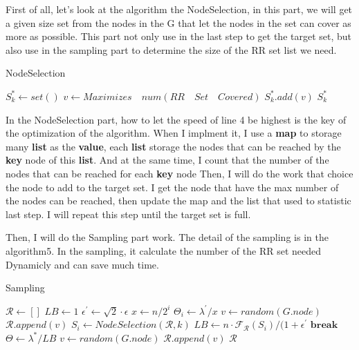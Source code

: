 \documentclass[conference,compsoc]{IEEEtran}
\begin{document}
      First of all, let's look at the algorithm the NodeSelection, in this part, we will get a given size set from the nodes in the G that let the nodes in the set can cover as more as possible.
      This part not only use in the last step to get the target set, but also use in the sampling part to determine the size of the RR set list we need.
      \begin{algorithm}
        \caption{NodeSelection}
        \begin{algorithmic}[1]
            \State $S_{k}^{*}\gets set()$
              \State $v\gets Maximizes\quad num(RR\quad Set\quad Covered)$
              \State $S_{k}^{*}.add(v)$
            \EndFor
          \EndFunction
          \State \Return $S_{k}^{*}$
        \end{algorithmic}
      \end{algorithm}
      In the NodeSelection part, how to let the speed of line 4 be highest is the key of the optimization of the algorithm.
      When I implment it, I use a \textbf{map} to storage many \textbf{list} as the \textbf{{value}}, each \textbf{list} storage the nodes that can be reached by the \textbf{key} node of this \textbf{list}.
      And at the same time, I count that the number of the nodes that can be reached for each \textbf{key} node
      Then, I will do the work that choice the node to add to the target set. I get the node that have the max number of the nodes can be reached, then update the map and the list that used to statistic last step.
      I will repeat this step until the target set is full.
      
      Then, I will do the Sampling part work. The detail of the sampling is in the algorithm5. 
      In the sampling, it calculate the number of the RR set needed Dynamicly and can save much time.
      \begin{algorithm}
        \caption{Sampling}
        \begin{algorithmic}[1]
            \State $\mathcal{R}\gets []$
            \State $LB\gets 1$
            \State $\epsilon^{'} \gets \sqrt{2}\cdot\epsilon$
              \State $x\gets n/2^i$
              \State $\Theta_i \gets \lambda^{'}/x$
                \State $v\gets random(G.node)$
                \State $\mathcal{R}.append(v)$
              \EndWhile
              \State $S_i\gets NodeSelection(\mathcal{R},k)$
                \State $LB\gets n\cdot\mathcal{F_R}(S_i)/(1+\epsilon^{'}$
                \State $\textbf{break}$
              \EndIf
            \EndFor
            \State $\Theta\gets\lambda^{*}/LB$
              \State $v\gets random(G.node)$
              \State $\mathcal{R}.append(v)$
            \EndWhile
            \State \Return $\mathcal{R}$
          \EndFunction
        \end{algorithmic}
      \end{algorithm}
\end{document}
